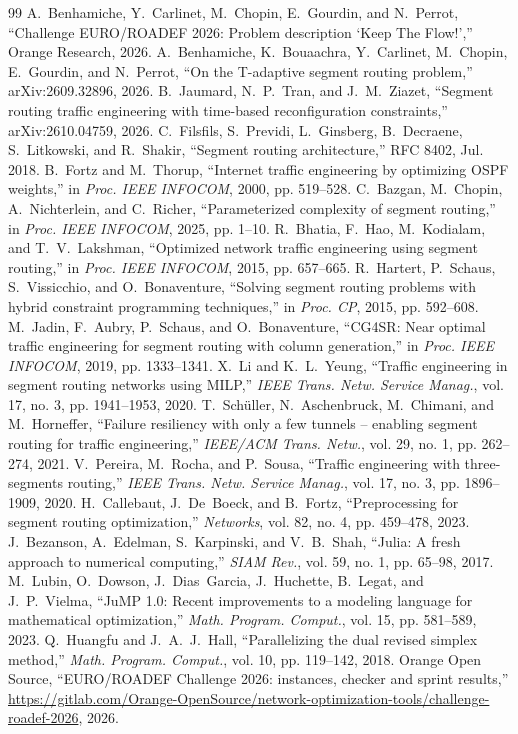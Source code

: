 \documentclass[conference]{IEEEtran}
\begin{document}
\begin{thebibliography}{99}\footnotesize
{} A.~Benhamiche, Y.~Carlinet, M.~Chopin, E.~Gourdin, and N.~Perrot, ``Challenge EURO/ROADEF 2026: Problem description `Keep The Flow!','' Orange Research, 2026.
 A.~Benhamiche, K.~Bouaachra, Y.~Carlinet, M.~Chopin, E.~Gourdin, and N.~Perrot, ``On the T-adaptive segment routing problem,'' arXiv:2609.32896, 2026.
 B.~Jaumard, N.~P.~Tran, and J.~M.~Ziazet, ``Segment routing traffic engineering with time-based reconfiguration constraints,'' arXiv:2610.04759, 2026.
 C.~Filsfils, S.~Previdi, L.~Ginsberg, B.~Decraene, S.~Litkowski, and R.~Shakir, ``Segment routing architecture,'' RFC 8402, Jul. 2018.
 B.~Fortz and M.~Thorup, ``Internet traffic engineering by optimizing OSPF weights,'' in \emph{Proc. IEEE INFOCOM}, 2000, pp. 519--528.
 C.~Bazgan, M.~Chopin, A.~Nichterlein, and C.~Richer, ``Parameterized complexity of segment routing,'' in \emph{Proc. IEEE INFOCOM}, 2025, pp. 1--10.
 R.~Bhatia, F.~Hao, M.~Kodialam, and T.~V.~Lakshman, ``Optimized network traffic engineering using segment routing,'' in \emph{Proc. IEEE INFOCOM}, 2015, pp. 657--665.
 R.~Hartert, P.~Schaus, S.~Vissicchio, and O.~Bonaventure, ``Solving segment routing problems with hybrid constraint programming techniques,'' in \emph{Proc. CP}, 2015, pp. 592--608.
 M.~Jadin, F.~Aubry, P.~Schaus, and O.~Bonaventure, ``CG4SR: Near optimal traffic engineering for segment routing with column generation,'' in \emph{Proc. IEEE INFOCOM}, 2019, pp. 1333--1341.
 X.~Li and K.~L.~Yeung, ``Traffic engineering in segment routing networks using MILP,'' \emph{IEEE Trans. Netw. Service Manag.}, vol. 17, no. 3, pp. 1941--1953, 2020.
 T.~Sch\"uller, N.~Aschenbruck, M.~Chimani, and M.~Horneffer, ``Failure resiliency with only a few tunnels -- enabling segment routing for traffic engineering,'' \emph{IEEE/ACM Trans. Netw.}, vol. 29, no. 1, pp. 262--274, 2021.
 V.~Pereira, M.~Rocha, and P.~Sousa, ``Traffic engineering with three-segments routing,'' \emph{IEEE Trans. Netw. Service Manag.}, vol. 17, no. 3, pp. 1896--1909, 2020.
 H.~Callebaut, J.~De~Boeck, and B.~Fortz, ``Preprocessing for segment routing optimization,'' \emph{Networks}, vol. 82, no. 4, pp. 459--478, 2023.
 J.~Bezanson, A.~Edelman, S.~Karpinski, and V.~B.~Shah, ``Julia: A fresh approach to numerical computing,'' \emph{SIAM Rev.}, vol. 59, no. 1, pp. 65--98, 2017.
 M.~Lubin, O.~Dowson, J.~Dias~Garcia, J.~Huchette, B.~Legat, and J.~P.~Vielma, ``JuMP 1.0: Recent improvements to a modeling language for mathematical optimization,'' \emph{Math. Program. Comput.}, vol. 15, pp. 581--589, 2023.
 Q.~Huangfu and J.~A.~J.~Hall, ``Parallelizing the dual revised simplex method,'' \emph{Math. Program. Comput.}, vol. 10, pp. 119--142, 2018.
 Orange Open Source, ``EURO/ROADEF Challenge 2026: instances, checker and sprint results,'' \url{https://gitlab.com/Orange-OpenSource/network-optimization-tools/challenge-roadef-2026}, 2026.
\end{thebibliography}
\end{document}
